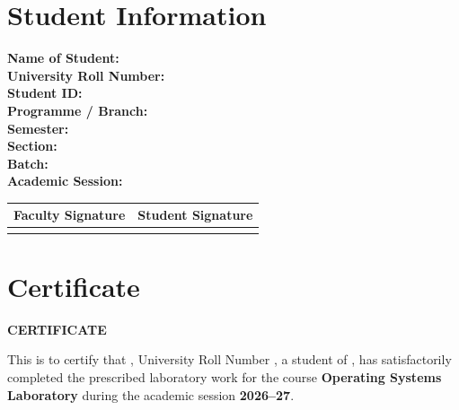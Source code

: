 \documentclass[12pt,a4paper]{report}
\newcommand{\labfield}[1]{
\noindent\textbf{#1:}\hrulefill\\[0.35cm]
}
\begin{document}

\chapter*{Student Information}

\vspace{0.5cm}

\labfield{Name of Student}
\labfield{University Roll Number}
\labfield{Student ID}
\labfield{Programme / Branch}
\labfield{Semester}
\labfield{Section}
\labfield{Batch}
\labfield{Academic Session}

\vspace{1cm}

\begin{center}
\begin{tabular}{|p{5cm}|p{5cm}|}
\hline
\centering\textbf{Faculty Signature} &
\centering\arraybackslash\textbf{Student Signature} \\
\hline
\vspace{2cm} & \\
\hline
\end{tabular}
\end{center}


\chapter*{Certificate}

\vspace{1cm}

\begin{center}
\textbf{\Large CERTIFICATE}
\end{center}

\vspace{0.8cm}

\onehalfspacing

This is to certify that
\underline{\hspace{7cm}},
University Roll Number
\underline{\hspace{4cm}},
a student of
\underline{\hspace{5cm}},
has satisfactorily completed the prescribed laboratory work for the course
\textbf{Operating Systems Laboratory} during the academic session
\textbf{2026--27}.
\end{document}
